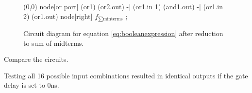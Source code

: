 \documentclass[11pt]{article}
\begin{document}
\begin{question}
\begin{figure}[h]
\begin{center}
\begin{circuitikz}
				(0,0) node[or port] (or1) {}
				(or2.out) -| (or1.in 1)
				(and1.out) -| (or1.in 2)
				(or1.out) node[right] {$f_{\sum\text{minterms}}$}
				;
			\end{circuitikz}
		\end{center}
		\caption{
			\label{fig:cdiagram}
			Circuit diagram for equation \ref{eq:booleanexpression} after reduction to sum of midterms.
		}
	\end{figure}

\end{question}

\begin{question}
	Compare the circuits.

	Testing all 16 possible input combinations resulted in identical outputs
	if the gate delay is set to 0ns.
\end{question}
\end{document}
